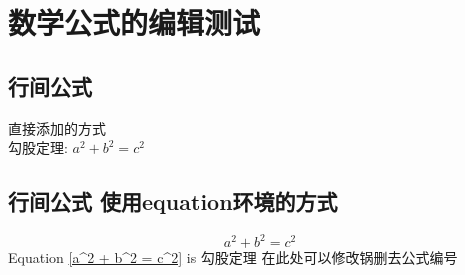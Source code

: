 \documentclass[11pt,twoside,a4paper]{ctexart}
\begin{document}
    \section{数学公式的编辑测试}
    \subsection{行间公式}
    直接添加的方式\\
    勾股定理:
    $ a^2 + b^2 = c^2 $
    \subsection{行间公式 使用equation环境的方式}
    \begin{equation}
        a^2 + b^2 = c^2 \label{a^2 + b^2 = c^2}
    \end{equation}
    Equation \eqref{a^2 + b^2 = c^2} is 勾股定理
    在此处可以修改锅删去公式编号
\end{document}
